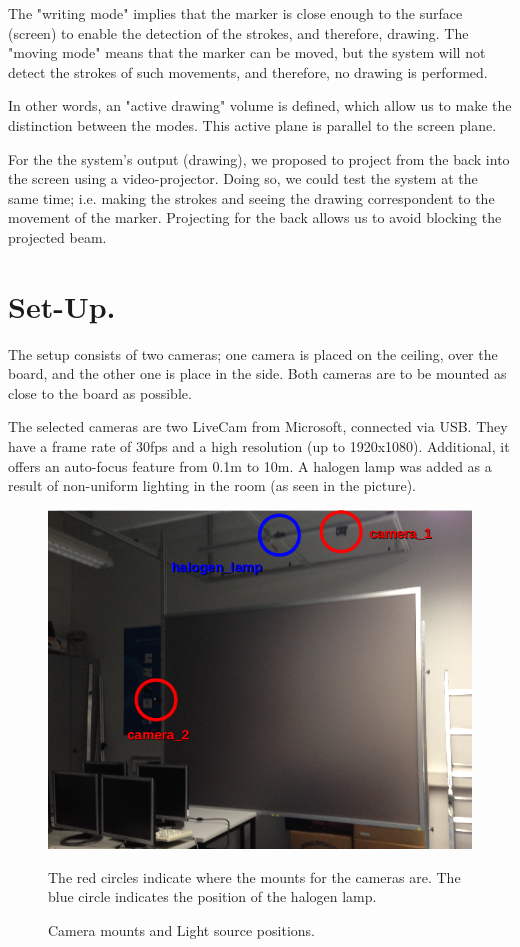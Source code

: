 \documentclass[a4paper,12pt]{article}
\begin{document}
The "writing mode" implies that the marker is close enough to the surface (screen) to enable the detection of the strokes, and therefore, drawing. The "moving mode" means that the marker can be moved, but the system will not detect the strokes of such movements, and therefore, no drawing is performed.

In other words, an "active drawing" volume is defined, which allow us to make the distinction between the modes. This active plane is parallel to the screen plane.

For the the system's output (drawing), we proposed to project from the back into the screen using a video-projector. Doing so, we could test the system at the same time; i.e. making the strokes and seeing the drawing correspondent to the movement of the marker. Projecting for the back allows us to avoid blocking the projected beam.

\section{Set-Up.}
The setup consists of two cameras; one camera is placed on the ceiling, over the board, and the other one is place in the side. Both cameras are to be mounted as close to the board as possible.

The selected cameras are two LiveCam from Microsoft, connected via USB. They have a frame rate of 30fps and a high resolution (up to 1920x1080). Additional, it offers an auto-focus feature from 0.1m to 10m. A halogen lamp was added as a result of non-uniform lighting in the room (as seen in the picture).

\begin{figure}[H]
    \begin{center}
	\includegraphics[width=12cm]{setupCams}
	\caption{Camera mounts and Light source positions.}
    The red circles indicate where the mounts for the cameras are. The blue circle indicates the position of the halogen lamp.
	\label{fig:setupcams}
    \end{center}
\end{figure}
\end{document}
